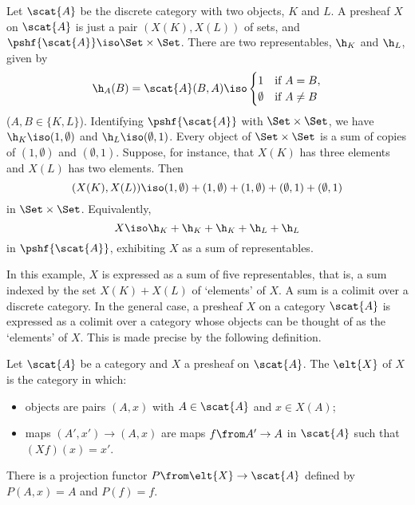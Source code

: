 \begin{example} 
\label{eg:discrete-dense}
Let $\scat{A}$ be the discrete category with two objects, $K$ and $L$.  A
presheaf $X$ on $\scat{A}$ is just a pair $(X(K), X(L))$ of sets, and
$\pshf{\scat{A}} \iso \Set \times \Set$.  There are two representables,
$\h_K$ and $\h_L$, given by
\[
\h_A(B) 
= 
\scat{A}(B, A)
\iso
\begin{cases}
1               &\text{if } A = B,    \\
\emptyset       &\text{if } A \neq B  
\end{cases}
\]
($A, B \in \{ K, L \}$).  Identifying $\pshf{\scat{A}}$ with $\Set \times
\Set$, we have $\h_K \iso (1, \emptyset)$ and $\h_L \iso (\emptyset, 1)$.
Every object of $\Set \times \Set$ is a sum of copies of $(1, \emptyset)$
and $(\emptyset, 1)$.  Suppose, for instance, that $X(K)$ has three elements
and $X(L)$ has two elements.  Then
\[
(X(K), X(L))
\iso
(1, \emptyset) + (1, \emptyset) + (1, \emptyset) + 
(\emptyset, 1) + (\emptyset, 1)
\]
in $\Set \times \Set$.  Equivalently,
\[
X 
\iso 
\h_K + \h_K + \h_K + \h_L + \h_L 
\]
in $\pshf{\scat{A}}$, exhibiting $X$ as a sum of representables.  
\end{example}

In this example, $X$ is expressed as a sum of five representables, that is,
a sum indexed by the set $X(K) + X(L)$ of `elements' of $X$.  A sum is a
colimit over a discrete category.  In the general case, a presheaf $X$ on a
category $\scat{A}$ is expressed as a colimit over a category whose objects
can be thought of as the `elements' of $X$.  This is made precise by the
following definition.

\begin{defn}    
\label{defn:cat-elts}
Let $\scat{A}$ be a category and $X$ a presheaf on $\scat{A}$.  The
 $\elt{X}$%
%
%
of $X$ is the category in which:
% 
\begin{itemize}
\item 
objects are pairs $(A, x)$ with $A \in \scat{A}$ and $x \in X(A)$;

\item 
maps $(A', x') \to (A, x)$ are maps $f\from A' \to A$ in $\scat{A}$ such
that $(Xf)(x) = x'$.
\end{itemize}
\end{defn}
% 
There is a projection functor $P\from \elt{X} \to \scat{A}$ defined by $P(A, x)
= A$ and $P(f) = f$.


